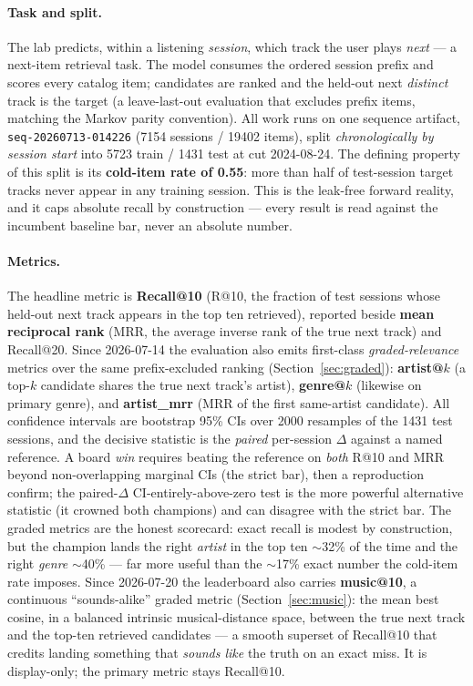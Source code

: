\documentclass[11pt]{article}
\newcommand{\dsid}[1]{\texttt{\small #1}}
\begin{document}
\paragraph{Task and split.} The lab predicts, within a listening
\emph{session}, which track the user plays \emph{next} --- a next-item
retrieval task. The model consumes the ordered session prefix and scores every
catalog item; candidates are ranked and the held-out next \emph{distinct} track
is the target (a leave-last-out evaluation that excludes prefix items, matching
the Markov parity convention). All work runs on one sequence artifact,
\dsid{seq-20260713-014226} (\num{7154} sessions / \num{19402} items), split
\emph{chronologically by session start} into \num{5723} train / \num{1431} test
at cut 2024-08-24. The defining property of this split is its \textbf{cold-item
rate of \num{0.55}}: more than half of test-session target tracks never appear
in any training session. This is the leak-free forward reality, and it caps
absolute recall by construction --- every result is read against the incumbent
baseline bar, never an absolute number.

\paragraph{Metrics.} The headline metric is \textbf{Recall@10} (R@10, the
fraction of test sessions whose held-out next track appears in the top ten
retrieved), reported beside \textbf{mean reciprocal rank} (MRR, the average
inverse rank of the true next track) and Recall@20. Since 2026-07-14 the
evaluation also emits first-class \emph{graded-relevance} metrics over the same
prefix-excluded ranking (Section~\ref{sec:graded}): \textbf{artist@$k$} (a
top-$k$ candidate shares the true next track's artist), \textbf{genre@$k$}
(likewise on primary genre), and \textbf{artist\_mrr} (MRR of the first
same-artist candidate). All confidence intervals are bootstrap 95\% CIs over
\num{2000} resamples of the \num{1431} test sessions, and the decisive
statistic is the \emph{paired} per-session $\Delta$ against a named reference.
A board \emph{win} requires beating the reference on \emph{both} R@10 and MRR
beyond non-overlapping marginal CIs (the strict bar), then a reproduction
confirm; the paired-$\Delta$ CI-entirely-above-zero test is the more powerful
alternative statistic (it crowned both champions) and can disagree with the
strict bar. The graded metrics are the honest scorecard: exact recall is modest
by construction, but the champion lands the right \emph{artist} in the top ten
$\sim$32\% of the time and the right \emph{genre} $\sim$40\% --- far more useful
than the $\sim$17\% exact number the cold-item rate imposes. Since 2026-07-20 the
leaderboard also carries \textbf{music@10}, a continuous ``sounds-alike'' graded
metric (Section~\ref{sec:music}): the mean best cosine, in a balanced intrinsic
musical-distance space, between the true next track and the top-ten retrieved
candidates --- a smooth superset of Recall@10 that credits landing something that
\emph{sounds like} the truth on an exact miss. It is display-only; the primary
metric stays Recall@10.
\end{document}
